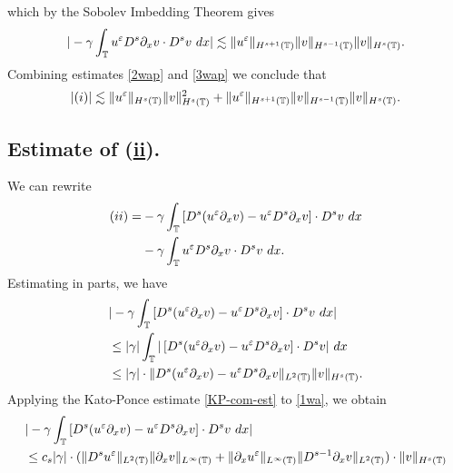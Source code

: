 which by the Sobolev Imbedding Theorem gives 
\begin{equation}
\begin{split}
| - \gamma \int_{\mathbb{T}} u^\varepsilon D^s \partial_x v \cdot D^s v \ dx |
\lesssim \|u^\varepsilon \|_{H^{s+1}(\mathbb{T})} \|v\|_{H^{s-1}(\mathbb{T})}
\|v\|_{H^s(\mathbb{T})}.
\label{3wap}
\end{split}
\end{equation}
Combining estimates \eqref{2wap} and \eqref{3wap} we conclude that
\begin{equation}
\begin{split}
|(i)| \lesssim \|u^\varepsilon \|_{H^s(\mathbb{T})} \|v\|_{H^s(\mathbb{T})}^2 + 
\|u^\varepsilon \|_{H^{s+1}(\mathbb{T})} \|v\|_{H^{s-1}(\mathbb{T})}
\|v\|_{H^s(\mathbb{T})}.
\label{4wap}
\end{split}
\end{equation}
%
\subsection{Estimate of (\hyperref[8u]{ii}).} We can rewrite
\begin{equation}
\begin{split}
(ii)
= & -\gamma \int_{\mathbb{T}} \left[ D^s(u^\varepsilon \partial_x v) - u^\varepsilon D^s
\partial_x v \right] \cdot D^s v \ dx
\\
& -  \gamma \int_{\mathbb{T}} u^\varepsilon D^s \partial_x v \cdot D^s v \ dx.
\label{1wa'}
\end{split}
\end{equation}
Estimating in parts, we have
\begin{equation}
\begin{split}
& |-\gamma \int_{\mathbb{T}} \left[ D^s(u^\varepsilon \partial_x v) - u^\varepsilon D^s
\partial_x v \right] \cdot D^s v \ dx |
\\
& \le |\gamma| \int_{\mathbb{T}} |\left[ D^s(u^\varepsilon \partial_x v) - u^\varepsilon D^s
\partial_x v \right] \cdot D^s v| \ dx
\\
& \le |\gamma| \cdot \|D^s (u^\varepsilon \partial_x v) - u^\varepsilon D^s \partial_x v
\|_{L^2(\mathbb{T})} \|v\|_{H^s(\mathbb{T})}.
\label{1wa}
\end{split}
\end{equation}
Applying the Kato-Ponce estimate \eqref{KP-com-est} to \eqref{1wa}, we
obtain
\begin{equation*}
\begin{split}
& | -\gamma \int_{\mathbb{T}} \left[ D^s(u^\varepsilon \partial_x v) - u^\varepsilon D^s
\partial_x v \right] \cdot D^s v \ dx |
\\
& \le c_s |\gamma| \cdot ( \|D^s u^\varepsilon \|_{L^2(\mathbb{T})} \|\partial_x
v\|_{L^\infty(\mathbb{T})} + \|\partial_x u^\varepsilon \|_{L^\infty(\mathbb{T})} \|D^{s-1}
\partial_x v \|_{L^2(\mathbb{T})}) \cdot \|v\|_{H^s(\mathbb{T})}
\end{split}
\end{equation*}
